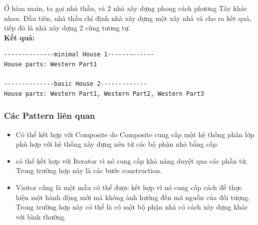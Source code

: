 Ở hàm main, ta gọi nhà thầu, và 2 nhà xây dựng phong cách phương Tây khác nhau. Đầu tiên, nhà thầu chỉ định nhà xây dựng một xây nhà và cho ra kết quả, tiếp đó là nhà xây dựng 2 cũng tương tự.\\
\newline
\textbf{Kết quả:}
\begin{lstlisting}
--------------minimal House 1-------------
House parts: Western Part1

--------------basic House 2-------------
House parts: Western Part1, Western Part2, Western Part3    
\end{lstlisting}
\subsubsection{Các Pattern liên quan}
\begin{itemize}
    \item Có thể kết hợp với Composite do Composite cung cấp một hệ thống phân lớp phù hợp với hệ thống xây dựng nên từ các bộ phận nhỏ bằng cấp.
    \item có thể kết hợp với Iterator vì nó cung cấp khả năng duyệt qua các phần từ. Trong trường hợp này là các bước construction.
    \item Visitor cũng là một mẫu có thể được kết hợp vì nó cung cấp cách để thực hiện một hành động mới mà không ảnh hưởng đến mã nguồn của đối tượng. Trong trường hợp này có thể là có một bộ phận nhà có cách xây dựng khác với bình thường.
\end{itemize}